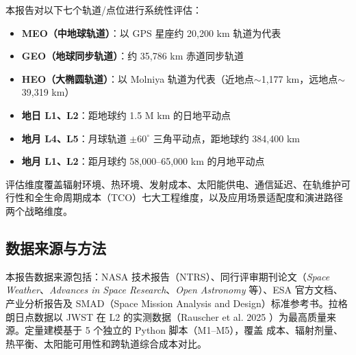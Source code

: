 本报告对以下七个轨道/点位进行系统性评估：

\begin{itemize}
    \item \textbf{MEO（中地球轨道）}：以 GPS 星座约 20,200 km 轨道为代表
    \item \textbf{GEO（地球同步轨道）}：约 35,786 km 赤道同步轨道
    \item \textbf{HEO（大椭圆轨道）}：以 Molniya 轨道为代表（近地点$\sim$1,177 km，远地点$\sim$39,319 km）
    \item \textbf{地日 L1、L2}：距地球约 1.5 M km 的日地平动点
    \item \textbf{地月 L4、L5}：月球轨道 $\pm 60^{\circ}$ 三角平动点，距地球约 384,400 km
    \item \textbf{地月 L1、L2}：距月球约 58,000--65,000 km 的月地平动点
\end{itemize}

评估维度覆盖辐射环境、热环境、\deltav 发射成本、太阳能供电、通信延迟、在轨维护可行性和全生命周期成本（TCO）七大工程维度，以及应用场景适配度和演进路径两个战略维度。

\subsection{数据来源与方法}

本报告数据来源包括：NASA 技术报告（NTRS）、同行评审期刊论文（\textit{Space Weather}、\textit{Advances in Space Research}、\textit{Open Astronomy} 等）、ESA 官方文档、产业分析报告及 SMAD（Space Mission Analysis and Design）标准参考书。拉格朗日点数据以 JWST 在 L2 的实测数据（Rauscher et al. 2025 \cite{jwst_cr_2025}）为最高质量来源。定量建模基于 5 个独立的 Python 脚本（M1--M5），覆盖 \deltav 成本、辐射剂量、热平衡、太阳能可用性和跨轨道综合成本对比。
